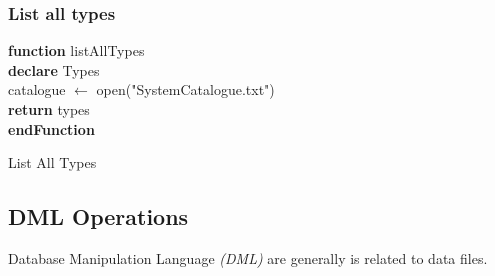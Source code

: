 \documentclass{article}
\newcounter{late}
\begin{document}
        \subsubsection{List all types}
            \begin{algorithm}[H]
\DontPrintSemicolon
\textbf{function} listAllTypes \\
\textbf{declare} Types \\
catalogue $\leftarrow$ open("SystemCatalogue.txt") \\
\textbf{return} types  \\ 
\textbf{endFunction} 
\caption{List All Types}
\end{algorithm}
\newpage
    \subsection{DML Operations}
     Database Manipulation Language \emph{(DML)} are generally is related to data files.
\end{document}
